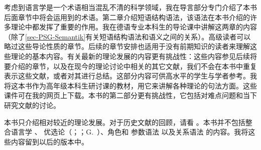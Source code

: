 考虑到语言学是一个术语相当混乱不清的科学领域，我在导言部分专门介绍了本书后面章节中将会运用到的术语。第二章介绍短语结构语法，该语法在本书介绍的许多理论中都发挥了重要的作用。我在德语专业本科生的导论课中讲解这两章的内容（除了\ref{sec-PSG-Semantik}有关短语结构语法和语义之间的关系）。高级读者可以略过这些导论性质的章节。后续的章节安排也适用于没有前期知识的读者来理解这些理论的基本内容。有关最新的理论发展的内容更有挑战性：这些内容参见后续将要介绍的章节，以及在现今的理论讨论中相关的其它文献，我们不会在本书中重复表示这些文献，或者对其进行总结。这部分内容可供高水平的学生与学者参考。我将这本书作为高年级本科生研讨课的教材，用它来讲解各种理论的句法方面。这些课件可在我的网页上下载。本书的第二部分更有挑战性，它包括对难点问题和当下研究文献的讨论。

本书只介绍相对较近的理论发展。对于历史文献的回顾，请看 。本书并不包括整
合语言学 \citep{Lieb83a-u,Eisenberg2004a,Nolda2007a-u}、
优选论\indexotc（\citealp{PS93a-u}；\citealp{Grimshaw97a-u}；G.\ \citealp{GMueller2000a-u}）、角色和
参数语法 \citep{vanValin93a-ed}以及关系语法
 \citep{Perlmutter83a-ed,Perlmutter84b-ed}的内容。我将这些内容留到以后的版本中。

